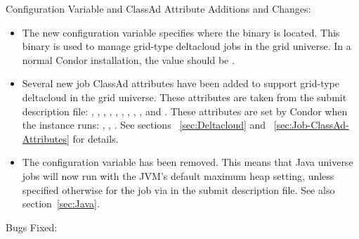 \noindent Configuration Variable and ClassAd Attribute Additions and Changes:

\begin{itemize}

\item The new configuration variable  specifies
where the  binary is located. This binary is used to
manage grid-type deltacloud jobs in the grid universe.
In a normal Condor installation, the value should be
.

\item Several new job ClassAd attributes have been added to support
grid-type deltacloud in the grid universe.
These attributes are taken from the submit description file:
,
,
,
,
,
,
,
,
, and
.
These attributes are set by Condor when the instance runs:
,
,
.
See sections ~\ref{sec:Deltacloud} and ~\ref{sec:Job-ClassAd-Attributes}
for details.

\item The configuration variable  
  has been removed. 
  This means that Java universe jobs will now run with the JVM's 
  default maximum heap setting,
  unless specified otherwise for the job via 
   in the submit description file. 
  See also section~\ref{sec:Java}.

\end{itemize}

\noindent Bugs Fixed:

